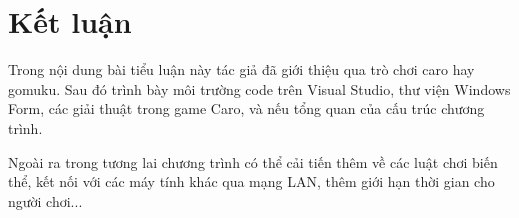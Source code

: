 \chapter*{Kết luận}
Trong nội dung bài tiểu luận này tác giả đã giới thiệu qua trò chơi caro hay gomuku. Sau đó trình bày môi trường code trên Visual Studio, thư viện Windows Form, các giải thuật trong game Caro, và nếu tổng quan của cấu trúc chương trình. 

Ngoài ra trong tương lai chương trình có thể cải tiến thêm về các luật chơi biến thể, kết nối với các máy tính khác qua mạng LAN, thêm giới hạn thời gian cho người chơi...